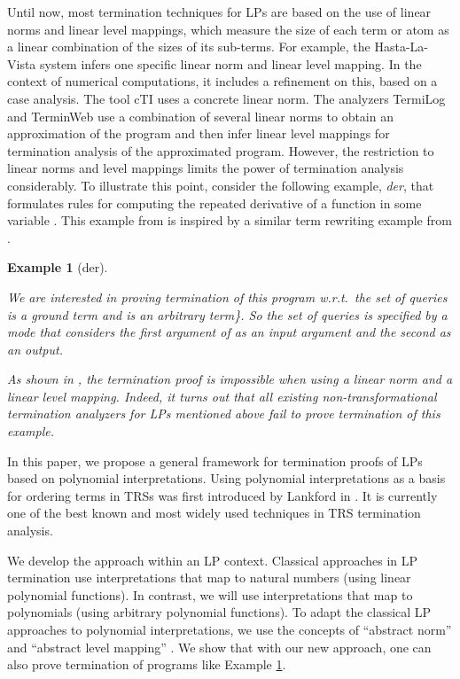 \documentclass[envcountsame]{tlp}
\newcounter{ex:der-lastsymconsctr}
\newtheorem{example}{Example}
\begin{document}
Until now, most termination techniques for LPs are based on the use of
linear
norms and linear level mappings,
which measure the size of each term or atom as a linear combination of the sizes of its
sub-terms. For example, the \textsf{Hasta-La-Vista} system
\cite{SerebrenikandDeSchreye03} 
infers one specific linear norm and linear level mapping. In the context of numerical
computations, it includes a refinement on this, based on a case analysis. 
The tool \textsf{cTI}
\cite{MesnardBagnara05} uses a concrete linear norm. The analyzers \textsf{TermiLog}
\cite{lindenstrauss97,Termilog} and \textsf{TerminWeb} \cite{Codishetal99,terminWeb02} use
a combination of several linear norms to obtain an
approximation of the program and then infer linear level mappings for termination
analysis of the approximated program. However, the
restriction to linear norms and level mappings limits the power of termination analysis
considerably. 
To
illustrate this point, consider the following example, \emph{der}, that formulates rules
for computing the repeated derivative of a function in some variable
. This example from \cite{DeSchreyeSerebrenik01,NaomiWST97} is inspired by a
similar term rewriting example 
from \cite{Dershowitz95}.

\begin{example}[der]\label{exam:der}

We are interested in proving termination of this program w.r.t.\ the set of queries  is a ground term and  is an arbitrary term\}.  So
the set of queries is specified by a \emph{mode} that considers
the first argument of  as an input argument and the second as an output.

As
shown in \cite{NaomiWST97,MNTDannyd05}, the termination proof is impossible when using
a linear norm and a linear level mapping. Indeed,
it turns out that all existing non-transformational termination analyzers for LPs
mentioned above fail to prove termination of this example.
{\hfill{}}
\end{example}

In this paper, we propose a general framework for termination proofs of LPs based on
polynomial interpretations. Using polynomial interpretations as a basis for ordering
terms in TRSs was first introduced by Lankford in
\cite{Lankford79}. It is currently one of the best known and most widely used techniques
in TRS termination analysis.

We develop the approach within an LP context. 
Classical approaches in LP termination use 
interpretations that map to
natural numbers (using linear polynomial functions). In contrast, we will use interpretations that
map to polynomials (using arbitrary polynomial functions). To adapt the
classical LP approaches to polynomial interpretations, we use the concepts
of ``abstract norm'' and ``abstract level mapping''
\cite{Verschaetse&DeSchreye91}.
We show that with our new approach, one can also prove termination of programs
like Example \ref{exam:der}.
\end{document}
